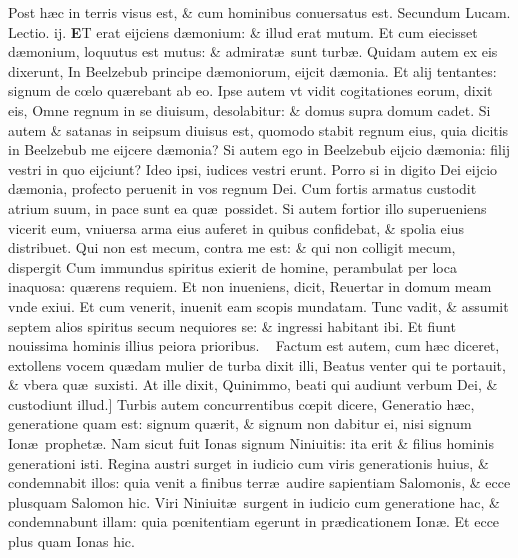 \documentclass[a5paper,10pt]{book}
\def\leftmarginnote{%
	\lrmarginnote{\hskip -\marginparsep \hskip -6.5em}}
\def\rightmarginnote{%
	\lrmarginnote{\hskip\columnwidth \hskip -1em}}
\def\ae{æ}
\def\oe{œ}
\begin{document}
\begin{multicols*}{2}
Post h\ae c in terris visus est, \& cum hominibus conuersatus est.
\newline \color{red} Secundum Lucam. \hfill Lectio. ij. \color{black}
\vspace{-1.25em}
\lettrine[lines=2]{\bfseries \color{red} E}{}\textdagger T\rightmarginnote{c. 11.\\c} erat eijciens d\ae monium: \& illud erat mutum.
Et cum eiecisset d\ae monium, loquutus est mutus: \& admirat\ae \ sunt turb\ae .
Quidam autem ex eis dixerunt, In Beelzebub principe d\ae moniorum, eijcit d\ae monia.
Et alij tentantes: signum de c\oe lo qu\ae rebant ab eo.
Ipse autem vt vidit cogitationes eorum, dixit eis, Omne regnum in se diuisum, desolabitur: \& domus supra domum cadet.
Si autem \& satanas in seipsum diuisus est, quomodo stabit regnum eius, quia dicitis in Beelzebub me eijcere d\ae monia?
Si autem ego in Beelzebub eijcio d\ae monia: filij vestri in quo eijciunt? Ideo ipsi, iudices vestri erunt.
Porro si in digito Dei eijcio d\ae monia, profecto peruenit in vos regnum Dei.
Cum fortis armatus custodit atrium suum, in pace sunt ea qu\ae \ possidet.
Si autem fortior illo superueniens vicerit eum, vniuersa arma eius auferet in quibus confidebat, \& spolia eius distribuet.
Qui non est mecum, contra me est: \& qui non colligit mecum, dispergit Cum immundus spiritus exierit de homine, perambulat per loca inaquosa: qu\ae rens requiem.
Et non inueniens, dicit, Reuertar in domum meam vnde exiui. Et cum venerit, inuenit eam scopis mundatam.
Tunc vadit, \& assumit septem alios spiritus secum nequiores se: \& ingressi habitant ibi.
Et fiunt nouissima hominis illius peiora\rightmarginnote{D} prioribus. \textdagger \ 
Factum est autem, cum h\ae c diceret, extollens vocem qu\ae dam mulier de turba dixit illi, Beatus venter qui te portauit, \& vbera qu\ae \ suxisti.
At ille dixit, Quinimmo, beati qui audiunt verbum Dei, \& custodiunt illud.]
Turbis\leftmarginnote{\begin{flushright}E\end{flushright}} autem concurrentibus c\oe pit dicere, Generatio h\ae c, generatione quam est: signum qu\ae rit, \& signum non dabitur ei, nisi signum Ion\ae \ prophet\ae .
Nam sicut fuit Ionas signum Niniuitis: ita erit \& filius hominis generationi isti.
Regina austri surget in iudicio cum viris generationis huius, \& condemnabit illos: quia venit a finibus terr\ae \ audire sapientiam Salomonis, \& ecce plusquam Salomon hic.
Viri Niniuit\ae \ surgent in iudicio cum generatione hac, \& condemnabunt illam: quia p\oe nitentiam egerunt in pr\ae dicationem Ion\ae . Et ecce plus quam Ionas hic.

\end{multicols*}
\end{document}
